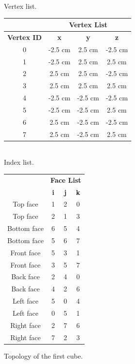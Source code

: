 \documentclass[11pt,oneside,a4paper,final]{article}
\begin{document}
\begin{figure}[tbh]
  Vertex list.\\{
    {\begin{tabular}{|c|c|c|c|}
	\cline{2-4}
	\multicolumn{1}{c|}{} & \multicolumn{3}{c|}{\textbf{Vertex List}} \\
	\hline
	\textbf{Vertex ID} & \textbf{x} & \textbf{y} & \textbf{z} \\
	\hline
	0 & -2.5 cm &  2.5 cm & -2.5 cm \\
	\hline
	1 & -2.5 cm &  2.5 cm &  2.5 cm \\
	\hline
	2 &  2.5 cm &  2.5 cm & -2.5 cm \\
	\hline
	3 &  2.5 cm &  2.5 cm &  2.5 cm \\
	\hline
	4 & -2.5 cm & -2.5 cm & -2.5 cm \\
	\hline
	5 & -2.5 cm & -2.5 cm &  2.5 cm \\
	\hline
	6 &  2.5 cm & -2.5 cm & -2.5 cm \\
	\hline
	7 &  2.5 cm & -2.5 cm &  2.5 cm \\
	\hline
\end{tabular}}
 }\\[1em]

 Index list.\\{
{
\begin{tabular}{|c|c|c|c|}
	\cline{2-4}
	\multicolumn{1}{c|}{} & \multicolumn{3}{c|}{\textbf{Face List}} \\
	\cline{2-4}
	\multicolumn{1}{c|}{} & \textbf{i} & \textbf{j} & \textbf{k} \\
	\hline
	Top face & 1 & 2 & 0 \\
	\hline
	Top face & 2 & 1 & 3 \\
	\hline
	Bottom face & 6 & 5 & 4 \\
	\hline
	Bottom face & 5 & 6 & 7 \\
	\hline
	Front face & 5 & 3 & 1 \\
	\hline
	Front face & 3 & 5 & 7 \\
	\hline
	Back face & 2 & 4 & 0 \\
	\hline
	Back face & 4 & 2 & 6 \\
	\hline
	Left face & 5 & 0 & 4 \\
	\hline
	Left face & 0 & 5 & 1 \\
	\hline
	Right face & 2 & 7 & 6 \\
	\hline
	Right face & 7 & 2 & 3 \\
	\hline
\end{tabular}}}
\fi
 \caption{\label{fig:cube_01} Topology of the first cube.}
\end{figure}
\end{document}
